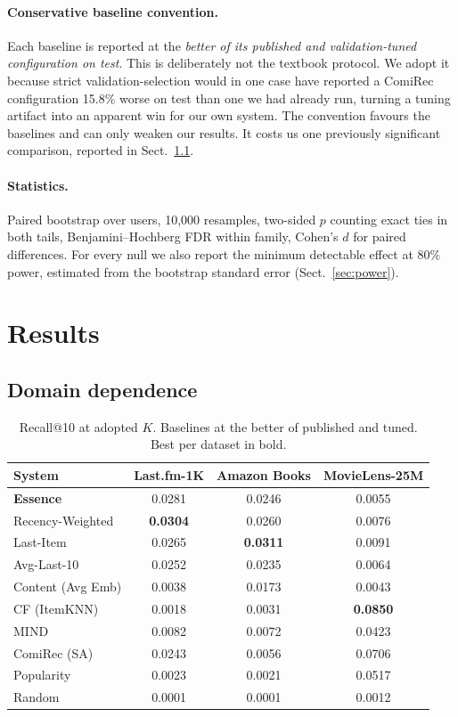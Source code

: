 \documentclass[runningheads,a4paper]{llncs}
\begin{document}
\paragraph{Conservative baseline convention.} Each baseline is reported at the
\emph{better of its published and validation-tuned configuration on test}. This is
deliberately not the textbook protocol. We adopt it because strict validation-selection
would in one case have reported a ComiRec configuration 15.8\% worse on test than one we
had already run, turning a tuning artifact into an apparent win for our own system. The
convention favours the baselines and can only weaken our results. It costs us one
previously significant comparison, reported in Sect.~\ref{sec:domain}.

\paragraph{Statistics.} Paired bootstrap over users, 10{,}000 resamples, two-sided
$p$ counting exact ties in both tails, Benjamini--Hochberg FDR within family, Cohen's $d$
for paired differences. For every null we also report the minimum detectable effect at
80\% power, estimated from the bootstrap standard error (Sect.~\ref{sec:power}).

\section{Results}

\subsection{Domain dependence}\label{sec:domain}

\begin{table}[tb]
\caption{Recall@10 at adopted $K$. Baselines at the better of published and tuned.
Best per dataset in bold.}\label{tab:main}
\centering
\footnotesize
\begin{tabular}{@{}lccc@{}}
\toprule
System & Last.fm-1K & Amazon Books & MovieLens-25M \\
\midrule
\textbf{Essence} & 0.0281 & 0.0246 & 0.0055 \\
Recency-Weighted & \textbf{0.0304} & 0.0260 & 0.0076 \\
Last-Item & 0.0265 & \textbf{0.0311} & 0.0091 \\
Avg-Last-10 & 0.0252 & 0.0235 & 0.0064 \\
Content (Avg Emb) & 0.0038 & 0.0173 & 0.0043 \\
CF (ItemKNN) & 0.0018 & 0.0031 & \textbf{0.0850} \\
MIND & 0.0082 & 0.0072 & 0.0423 \\
ComiRec (SA) & 0.0243 & 0.0056 & 0.0706 \\
Popularity & 0.0023 & 0.0021 & 0.0517 \\
Random & 0.0001 & 0.0001 & 0.0012 \\
\bottomrule
\end{tabular}
\end{table}
\end{document}

